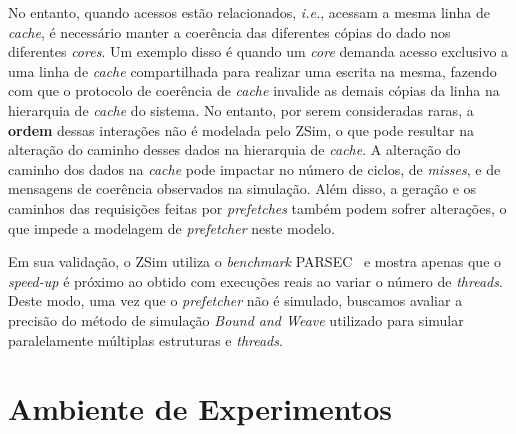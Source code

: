 \documentclass[12pt]{article}
\begin{document}

\vspace{-2mm}
No entanto, quando acessos estão relacionados, \emph{i.e.}, acessam a mesma linha de \mbox{\textit{cache}}, é necessário manter a coerência das diferentes cópias do dado nos diferentes \mbox{\textit{cores}}.
Um exemplo disso é quando um \textit{core} demanda acesso exclusivo a uma linha de \mbox{\textit{cache}} compartilhada para realizar uma escrita na mesma, fazendo com que o protocolo de coerência de \textit{cache} invalide as demais cópias da linha na hierarquia de \textit{cache} do sistema. 
No entanto, por serem consideradas raras, a \textbf{ordem} dessas interações não é modelada pelo ZSim, o que pode resultar na alteração do caminho desses dados na hierarquia de \textit{cache}.
A alteração do caminho dos dados na \textit{cache} pode impactar no número de ciclos, de \textit{misses}, e de mensagens de coerência observados na simulação.
Além disso, a geração e os caminhos das requisições feitas por \textit{prefetches} também podem sofrer alterações, o que impede a modelagem de \textit{prefetcher} neste modelo.


\vspace{-2mm}
Em sua validação, o ZSim utiliza o \emph{benchmark} PARSEC~\cite{bienia2008parsec} e mostra apenas que o \emph{speed-up} é próximo ao obtido com execuções reais ao variar o número de \emph{threads}.
Deste modo, uma vez que o \textit{prefetcher} não é simulado, buscamos avaliar a precisão do método de simulação \textit{Bound and Weave} utilizado para simular paralelamente múltiplas estruturas e \textit{threads}.

\vspace{-2mm}

\section{Ambiente de Experimentos}\label{metodologia}
\end{document}
